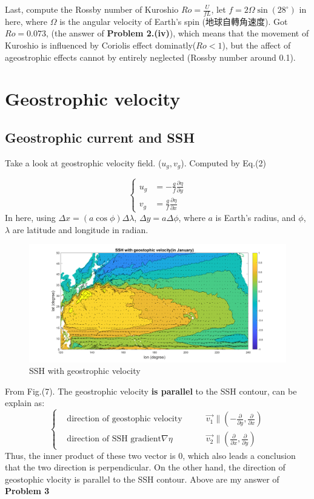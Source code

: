 \documentclass[12pt]{article}
\begin{document}
\begin{CJK*}{UTF8}{bsmi}
Last, compute the Rossby number of Kuroshio $Ro = \frac{U}{fL}$, let $f = 2\Omega \sin{(28^\circ)}$ in here, where $\Omega$ is the angular velocity of Earth's spin (地球自轉角速度). Got $Ro = 0.073$, (the answer of \textbf{Problem  2.(iv)}), which means that the movement of Kuroshio is influenced by Coriolis effect dominatly($Ro<1$), but the affect of ageostrophic effects cannot by entirely neglected (Rossby number around 0.1).
\newpage
\section{Geostrophic velocity}
\subsection{Geostrophic current and SSH}
\qquad Take a look at geostrophic velocity field. ($u_g, v_g$). Computed by Eq.(2)

\begin{equation}
\left\{
\begin{aligned}
	 u_g &= -\frac{g}{f} \frac{\partial \eta}{\partial y}\\
	 v_g &= \frac{g}{f} \frac{\partial \eta}{\partial x}
\end{aligned}
\right.
\end{equation}
In here, using $\Delta x = (a\cos{\phi}) \Delta \lambda$, $\Delta y = a\Delta \phi$, where $a$ is Earth's radius, and $\phi$, $\lambda$ are latitude and longitude in radian.\\
\begin{figure}[h]
 	\centering
	\includegraphics[width=1\textwidth]{Fig3a1.pdf}
	\caption{SSH with geostrophic velocity}
\end{figure}
From Fig.(7). The geostrophic velocity \textbf{is parallel} to the SSH contour, can be explain as:
\begin{equation}
\left\{
\begin{aligned}
	 &\text{direction of geostophic velocity} \qquad &\vec{v_1} \parallel(-\frac{\partial}{\partial y}, \frac{\partial}{\partial x})  \\
	 &\text{direction of SSH gradient}  \nabla \eta \qquad &\vec{v_2} \parallel (\frac{\partial}{\partial x}, \frac{\partial}{\partial y})
\end{aligned}
\right.
\end{equation}
Thus, the  inner product of these two vector is $0$, which also leads a conclusion that the two direction is perpendicular. On the other hand, the direction of geostophic vlocity is parallel to the SSH contour. Above are my answer of \textbf{Problem 3}\newpage

\end{CJK*}
\end{document}
